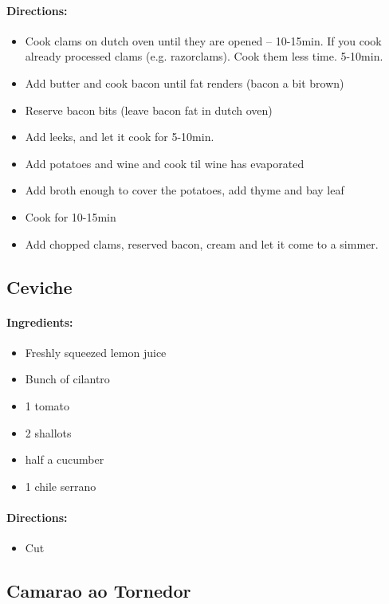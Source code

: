 \documentclass{article}
\begin{document}
\paragraph{Directions:}
\begin{itemize}
    \item Cook clams on dutch oven until they are opened -- 10-15min. If you cook already processed clams (e.g. razorclams). Cook them less time. 5-10min.
    \item Add butter and cook bacon until fat renders (bacon a bit brown)
    \item Reserve bacon bits (leave bacon fat in dutch oven)
    \item Add leeks, and let it cook for 5-10min.
    \item Add potatoes and wine and cook til wine has evaporated
    \item Add broth enough to cover the potatoes, add thyme and bay leaf
    \item Cook for 10-15min
    \item Add chopped clams, reserved bacon, cream and let it come to a simmer.
\end{itemize}

\subsection{Ceviche}

\paragraph{Ingredients:}
\begin{itemize}
    \item Freshly squeezed lemon juice
    \item Bunch of cilantro
    \item 1 tomato
    \item 2 shallots
    \item half a cucumber
    \item 1 chile serrano
\end{itemize}

\paragraph{Directions:}
\begin{itemize}
    \item Cut
\end{itemize}

\subsection{Camarao ao Tornedor} 
\end{document}
